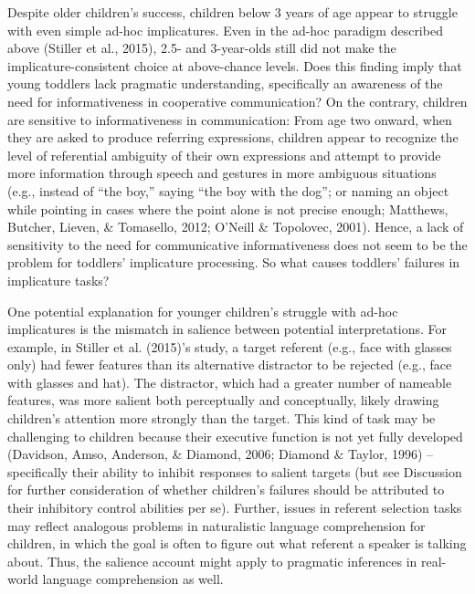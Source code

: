 \documentclass[man]{apa6}
\theoremstyle{definition}
\theoremstyle{definition}
\theoremstyle{definition}
\theoremstyle{remark}
\begin{document}
Despite older children's success, children below 3 years of age appear
to struggle with even simple ad-hoc implicatures. Even in the ad-hoc
paradigm described above (Stiller et al., 2015), 2.5- and 3-year-olds
still did not make the implicature-consistent choice at above-chance
levels. Does this finding imply that young toddlers lack pragmatic
understanding, specifically an awareness of the need for informativeness
in cooperative communication? On the contrary, children are sensitive to
informativeness in communication: From age two onward, when they are
asked to produce referring expressions, children appear to recognize the
level of referential ambiguity of their own expressions and attempt to
provide more information through speech and gestures in more ambiguous
situations (e.g., instead of ``the boy,'' saying ``the boy with the
dog''; or naming an object while pointing in cases where the point alone
is not precise enough; Matthews, Butcher, Lieven, \& Tomasello, 2012;
O'Neill \& Topolovec, 2001). Hence, a lack of sensitivity to the need
for communicative informativeness does not seem to be the problem for
toddlers' implicature processing. So what causes toddlers' failures in
implicature tasks?

One potential explanation for younger children's struggle with ad-hoc
implicatures is the mismatch in salience between potential
interpretations. For example, in Stiller et al. (2015)'s study, a target
referent (e.g., face with glasses only) had fewer features than its
alternative distractor to be rejected (e.g., face with glasses and hat).
The distractor, which had a greater number of nameable features, was
more salient both perceptually and conceptually, likely drawing
children's attention more strongly than the target. This kind of task
may be challenging to children because their executive function is not
yet fully developed (Davidson, Amso, Anderson, \& Diamond, 2006; Diamond
\& Taylor, 1996) -- specifically their ability to inhibit responses to
salient targets (but see Discussion for further consideration of whether
children's failures should be attributed to their inhibitory control
abilities per se). Further, issues in referent selection tasks may
reflect analogous problems in naturalistic language comprehension for
children, in which the goal is often to figure out what referent a
speaker is talking about. Thus, the salience account might apply to
pragmatic inferences in real-world language comprehension as well.
\end{document}
